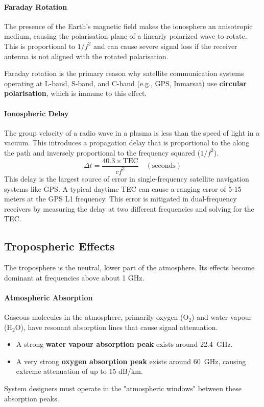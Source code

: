 \paragraph{Faraday Rotation}
The presence of the Earth's magnetic field makes the ionosphere an anisotropic medium, causing the polarisation plane of a linearly polarized wave to rotate. This  is proportional to $1/f^2$ and can cause severe signal loss if the receiver antenna is not aligned with the rotated polarisation.
\begin{warningbox}
    Faraday rotation is the primary reason why satellite communication systems operating at L-band, S-band, and C-band (e.g., GPS, Inmarsat) use \textbf{circular polarisation}, which is immune to this effect.
\end{warningbox}

\paragraph{Ionospheric Delay}
The group velocity of a radio wave in a plasma is less than the speed of light in a vacuum. This introduces a propagation delay that is proportional to the  along the path and inversely proportional to the frequency squared ($1/f^2$).
\begin{equation}
    \Delta t = \frac{40.3 \times \text{TEC}}{c f^2} \quad (\text{seconds})
\end{equation}
This delay is the largest source of error in single-frequency satellite navigation systems like GPS. A typical daytime TEC can cause a ranging error of 5-15 meters at the GPS L1 frequency. This error is mitigated in dual-frequency receivers by measuring the delay at two different frequencies and solving for the TEC.


\subsection{Tropospheric Effects}

The troposphere is the neutral, lower part of the atmosphere. Its effects become dominant at frequencies above about 1 GHz.

\paragraph{Atmospheric Absorption}
Gaseous molecules in the atmosphere, primarily oxygen (O$_2$) and water vapour (H$_2$O), have resonant absorption lines that cause signal attenuation.
\begin{itemize}
    \item A strong \textbf{water vapour absorption peak} exists around \qty{22.4}{GHz}.
    \item A very strong \textbf{oxygen absorption peak} exists around \qty{60}{GHz}, causing extreme attenuation of up to 15 dB/km.
\end{itemize}
System designers must operate in the "atmospheric windows" between these absorption peaks.

